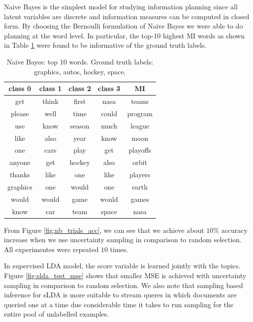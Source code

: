 Naive Bayes is the simplest model for studying information planning since all latent variables are discrete and information measures can be computed in closed form. By choosing the Bernoulli formulation of Naive Bayes we were able to do planning at the word level. In particular, the top-10 highest MI words as shown in Table \ref{tab:nb_words} were found to be informative of the ground truth labels.  
\begin{table}[h]
\begin{center}
  \begin{tabular}{c|c|c|c|c}
    \toprule
    class 0 & class 1 & class 2  & class 3 & MI       \\ \midrule
    get     & think   & first    & nasa    & teams    \\
    please  & well    & time     & could   & program  \\
    use     & know    & season   & much    & league   \\
    like    & also    & year     & know    & moon     \\
    one     & cars    & play     & get     & playoffs \\
    anyone  & get     & hockey   & also    & orbit    \\
    thanks  & like    & one      & like    & players  \\
    graphics& one     & would    & one     & earth    \\
    would   & would   & game     & would   & games    \\
    know    & car     & team     & space   & nasa     \\
    \bottomrule
  \end{tabular}
\end{center}
\caption{Naive Bayes: top 10 words. Ground truth labels: graphics, autos, hockey, space.}
\label{tab:nb_words}
\end{table}

From Figure \ref{fig:nb_trials_acc}, we can see that we achieve about $10\%$ accuracy increase when we use uncertainty sampling in comparison to random selection. All experimentes were repeated $10$ times.  

In supervised LDA model, the score variable is learned jointly with the topics. Figure \ref{fig:slda_test_mse} shows that smaller MSE is achieved with uncertainty sampling in comparison to random selection. We also note that sampling based inference for sLDA is more suitable to stream queres in which documents are queried one at a time due considerable time it takes to run sampling for the entire pool of unlabelled examples. 

